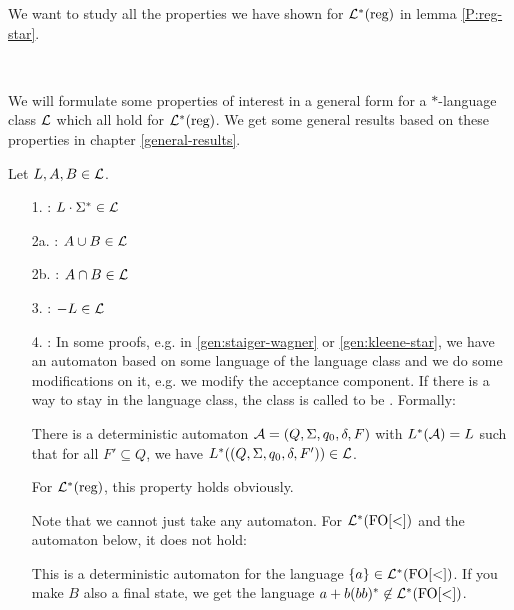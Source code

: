 We want to study all the properties we have shown for $\mathcal{L}^*(\text{reg})$ in lemma \ref{P:reg-star}.

\

We will formulate some properties of interest in a general form for a $*$-language class $\mathcal{L}$ which all hold for $\mathcal{L}^*(\text{reg})$. We get some general results based on these properties in chapter \ref{general-results}.

Let $L,A,B \in \mathcal{L}$.
\begin{enumerate}
\item[1.] : $L \cdot \Sigma^* \in \mathcal{L}$
\item[2a.] : $A \cup B \in \mathcal{L}$
\item[2b.] : $A \cap B \in \mathcal{L}$
\item[3.] : $- L \in \mathcal{L}$

\item[4.]
:
In some proofs, e.g. in \ref{gen:staiger-wagner} or \ref{gen:kleene-star}, we have an automaton based on some language of the language class and we do some modifications on it, e.g. we modify the acceptance component. If there is a way to stay in the language class, the class is called to be . Formally:

There is a deterministic automaton $\mathcal{A} = (Q,\Sigma,q_0,\delta,F)$ with $L^*(\mathcal{A}) = L$ such that for all $F' \subseteq Q$, we have $L^*((Q,\Sigma,q_0,\delta,F')) \in \mathcal{L}$.

For $\mathcal{L}^*(\text{reg})$, this property holds obviously.

Note that we cannot just take any automaton. For $\mathcal{L}^*(\mathrm{FO[<]})$ and the automaton below, it does not hold:

  
This is a deterministic automaton for the language $\Set{a} \in \Lang^*(\mathrm{FO[<]})$. If you make $B$ also a final state, we get the language $a + b(bb)^* \not\in \mathcal{L}^*(\mathrm{FO[<]})$.


\end{enumerate}



